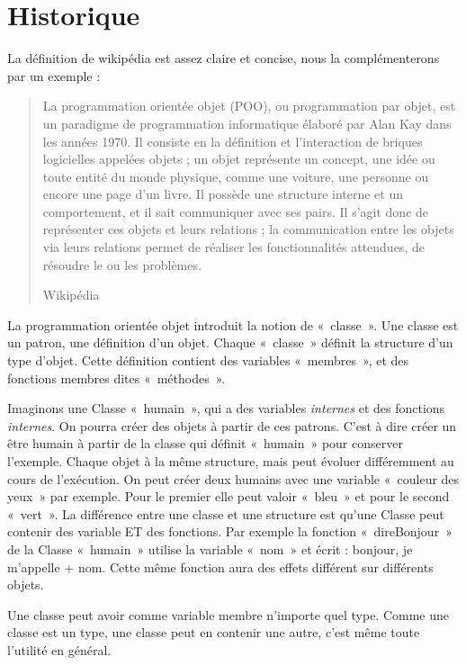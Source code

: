 
  \label{DefPOO}
  \section{Historique}
  	La définition de wikipédia est assez claire et concise, nous la complémenterons par un exemple : 
  	\begin{quotation}
  		La programmation orientée objet (POO), ou programmation par objet, est un paradigme de programmation informatique élaboré par Alan Kay dans les années 1970. Il consiste en la définition et l'interaction de briques logicielles appelées objets ; un objet représente un concept, une idée ou toute entité du monde physique, comme une voiture, une personne ou encore une page d'un livre. Il possède une structure interne et un comportement, et il sait communiquer avec ses pairs. Il s'agit donc de représenter ces objets et leurs relations ; la communication entre les objets via leurs relations permet de réaliser les fonctionnalités attendues, de résoudre le ou les problèmes.
  		\begin{flushright}
  			Wikipédia
  		\end{flushright}
  	\end{quotation}
  	
  	
    La programmation orientée objet introduit la notion de «~classe~». Une classe est 
    un patron, une définition d'un objet. Chaque «~classe~» définit la structure d'un type
    d'objet. Cette définition contient des variables «~membres~», et des fonctions membres dites «~méthodes~».
    
    Imaginons une Classe «~humain~», qui a des variables \textit{internes} et
    des fonctions \textit{internes}. On pourra créer des objets à partir de ces patrons. C'est à dire 
    créer un être humain à partir de la classe qui définit «~humain~» pour conserver l'exemple. Chaque objet 
    à la même structure, mais peut évoluer différemment au cours de l’exécution. On peut créer
    deux humains avec une variable «~couleur des yeux~» par exemple. Pour le premier elle peut valoir «~bleu~» et pour le second «~vert~». La différence entre une classe et une structure est qu'une Classe 
    peut contenir des variable ET des fonctions. Par exemple la fonction «~direBonjour~» de la 
    Classe «~humain~» utilise la variable «~nom~» et écrit : bonjour, je m'appelle + nom.
    Cette même fonction aura des effets différent sur différents objets.
    
    Une classe peut avoir comme variable membre n'importe quel type. Comme une classe est un type, une classe peut en contenir une autre, c'est même toute l'utilité en général.
